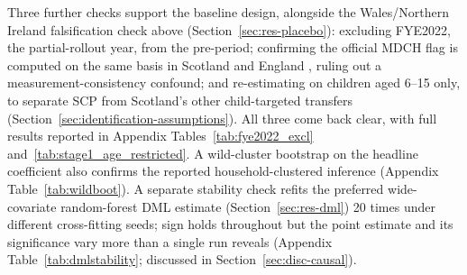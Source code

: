 Three further checks support the baseline design, alongside the Wales/Northern Ireland falsification check above (Section~\ref{sec:res-placebo}): excluding FYE2022, the partial-rollout year, from the pre-period; confirming the official MDCH flag is computed on the same basis in Scotland and England \citep{dwp2026}, ruling out a measurement-consistency confound; and re-estimating on children aged 6--15 only, to separate SCP from Scotland's other child-targeted transfers (Section~\ref{sec:identification-assumptions}). All three come back clear, with full results reported in Appendix Tables~\ref{tab:fye2022_excl} and~\ref{tab:stage1_age_restricted}. A wild-cluster bootstrap on the headline coefficient also confirms the reported household-clustered inference (Appendix Table~\ref{tab:wildboot}). A separate stability check refits the preferred wide-covariate random-forest DML estimate (Section~\ref{sec:res-dml}) 20 times under different cross-fitting seeds; sign holds throughout but the point estimate and its significance vary more than a single run reveals (Appendix Table~\ref{tab:dmlstability}; discussed in Section~\ref{sec:disc-causal}).